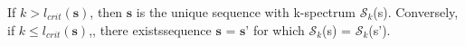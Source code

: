 \documentclass[preview]{standalone}
\begin{document}
\begin{center}
If $k > l_{crit}(\textbf{s})$, then $\textbf{s}$ is the unique sequence with k-spectrum $\mathcal{S}_k$(s). Conversely, if $k \le l_{crit}(\textbf{s})$,, there existssequence $\textbf{s = s'}$ for which $\mathcal{S}_k$(s) = $\mathcal{S}_k$(s').
\end{center}
\end{document}
